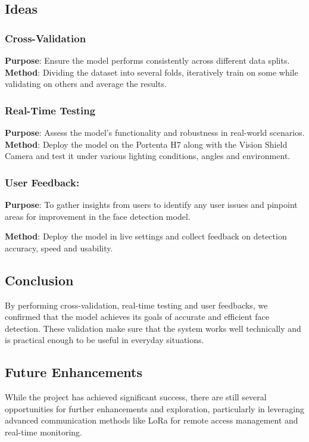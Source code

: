 \subsection{Ideas}
\subsubsection{Cross-Validation}
\textbf{Purpose}: Ensure the model performs consistently across different data splits.
\\
\textbf{Method}: Dividing the dataset into several folds, iteratively train on some while validating on others and average the results.

\subsubsection{Real-Time Testing}
\textbf{Purpose}: Assess the model's functionality and robustness in real-world scenarios.
\\\textbf{Method}: Deploy the model on the Portenta H7 along with the Vision Shield Camera and test it under various lighting conditions, angles and environment.

\subsubsection{User Feedback:}
\textbf{Purpose}: To gather insights from users to identify any user issues and pinpoint areas for improvement in the face detection model.

\textbf{Method}: Deploy the model in live settings and collect feedback on detection accuracy, speed and usability.

\subsection{Conclusion}
By performing cross-validation, real-time testing and user feedbacks, we confirmed that the model achieves its goals of accurate and efficient face detection. These validation make sure that the system works well technically and is practical enough to be useful in everyday situations.

\subsection{Future Enhancements}
While the project has achieved significant success, there are still several opportunities for further enhancements and exploration, particularly in leveraging advanced communication methods like LoRa for remote access management and real-time monitoring.

